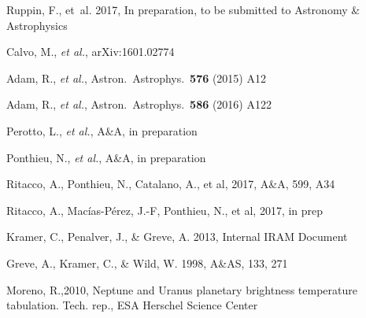\begin{thebibliography}{99}
Ruppin, F., {et~al.} 2017, 
In preparation, to be submitted to Astronomy \& Astrophysics

Calvo, M., {\it et al.}, arXiv:1601.02774  


Adam, R.,  {\it et al.},
  Astron.\ Astrophys.\  {\bf 576} (2015) A12
  
  
Adam, R.,  {\it et al.},
  Astron.\ Astrophys.\  {\bf 586} (2016) A122

    
Perotto, L., {\it et al.}, A\&A, in preparation

Ponthieu, N., {\it et al.}, A\&A, in preparation

Ritacco, A., Ponthieu, N., Catalano, A., et al, 2017, A\&A, 599, A34

Ritacco, A., Mac\'ias-P\'erez, J.-F, Ponthieu, N., et al, 2017, in prep


Kramer, C., Penalver, J., \& Greve, A. 2013, Internal IRAM Document

Greve, A., Kramer, C., \& Wild, W. 1998, A\&AS, 133, 271
 
Moreno, R.,2010, Neptune and Uranus planetary brightness temperature tabulation. Tech. rep., ESA Herschel Science Center
 

\end{thebibliography}
